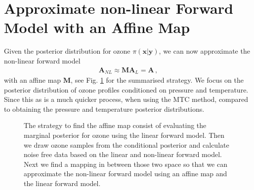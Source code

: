 \section{Approximate non-linear Forward Model with an Affine Map} 
\label{sec:affineMap}
Given the posterior distribution for ozone $ \pi(\bm{x}|\bm{y})$, we can now approximate the non-linear forward model 
\begin{align}
	\bm{A}_{NL} \approx \bm{M A}_L = \bm{A} \, ,
\end{align}
with an affine map $\bm{M}$, see Fig. \ref{fig:affinStrat} for the summarised strategy.
We focus on the posterior distribution of ozone profiles conditioned on pressure and temperature.
Since this as is a much quicker process, when using the MTC method, compared to obtaining the pressure and temperature posterior distributions.
\begin{figure}[htb!]
	\centering
	\caption[Strategy to find affine map.]{The strategy to find the affine map consist of evaluating the marginal posterior for ozone using the linear forward model. Then we draw ozone samples from the conditional posterior and calculate noise free data based on the linear and non-linear forward model. Next we find a mapping in between those two space so that we can approximate the non-linear forward model using an affine map and the linear forward model.}
	\label{fig:affinStrat}
\end{figure}
